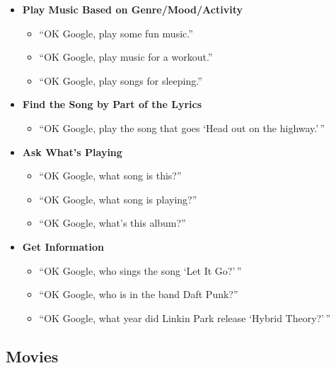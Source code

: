 \documentclass[
  jou,
  floatsintext,
  longtable,
  a4paper,
  nolmodern,
  notxfonts,
  notimes,
  12pt,
  colorlinks=true,linkcolor=blue,citecolor=blue,urlcolor=blue]{apa7}
\providecommand{\tightlist}{%
  \setlength{\itemsep}{0pt}\setlength{\parskip}{0pt}}
\begin{document}
\begin{itemize}
  \begin{itemize}
  \tightlist
  \item
    ``OK Google, skip forward 1 minute.''
  \item
    ``OK Google, skip back 1 minute.''
  \end{itemize}
\item
  \textbf{Play Music Based on Genre/Mood/Activity}

  \begin{itemize}
  \tightlist
  \item
    ``OK Google, play some fun music.''
  \item
    ``OK Google, play music for a workout.''
  \item
    ``OK Google, play songs for sleeping.''
  \end{itemize}
\item
  \textbf{Find the Song by Part of the Lyrics}

  \begin{itemize}
  \tightlist
  \item
    ``OK Google, play the song that goes `Head out on the highway.'\,''
  \end{itemize}
\item
  \textbf{Ask What's Playing}

  \begin{itemize}
  \tightlist
  \item
    ``OK Google, what song is this?''
  \item
    ``OK Google, what song is playing?''
  \item
    ``OK Google, what's this album?''
  \end{itemize}
\item
  \textbf{Get Information}

  \begin{itemize}
  \tightlist
  \item
    ``OK Google, who sings the song `Let It Go?'\,''
  \item
    ``OK Google, who is in the band Daft Punk?''
  \item
    ``OK Google, what year did Linkin Park release `Hybrid Theory?'\,''
  \end{itemize}
\end{itemize}

\subsection{Movies}\label{movies}
\end{document}
